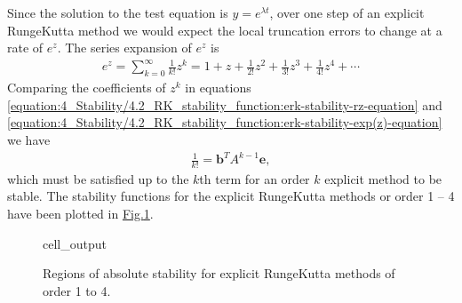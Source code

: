\documentclass[letterpaper,10pt,english]{jupyterBook}
\begin{document}
\sphinxAtStartPar
Since the solution to the test equation is \(y=e^{\lambda t}\), over one step of an explicit Runge\sphinxhyphen{}Kutta method we would expect the local truncation errors to change at a rate of \(e^z\). The series expansion of \(e^z\) is
\begin{equation}\label{equation:4_Stability/4.2_RK_stability_function:erk-stability-exp(z)-equation}
\begin{split}e^z = \sum_{k=0}^{\infty} \frac{1}{k!} z^k = 1 + z + \frac{1}{2!}z^2 + \frac{1}{3!}z^3 + \frac{1}{4!}z^4 + \cdots\end{split}
\end{equation}
\sphinxAtStartPar
Comparing the coefficients of \(z^k\) in equations \eqref{equation:4_Stability/4.2_RK_stability_function:erk-stability-rz-equation} and \eqref{equation:4_Stability/4.2_RK_stability_function:erk-stability-exp(z)-equation} we have
\begin{align*}
    \frac{1}{k!}= \mathbf{b}^T A^{k-1} \mathbf{e},
\end{align*}
\sphinxAtStartPar
which must be satisfied up to the \(k\)th term for an order \(k\) explicit method to be stable. The stability functions for the explicit Runge\sphinxhyphen{}Kutta methods or order 1 – 4 have been plotted in \hyperref[\detokenize{4_Stability/4.2_RK_stability_function:erk-stability-regions-figure}]{Fig.\@ \ref{\detokenize{4_Stability/4.2_RK_stability_function:erk-stability-regions-figure}}}.

\begin{figure}[htbp]
\centering
\capstart
\begin{sphinxVerbatimOutput}

\begin{sphinxuseclass}{cell_output}
\noindent{}

\end{sphinxuseclass}\end{sphinxVerbatimOutput}
\caption{Regions of absolute stability for explicit Runge\sphinxhyphen{}Kutta methods of order 1 to 4.}\label{\detokenize{4_Stability/4.2_RK_stability_function:erk-stability-regions-figure}}\end{figure}
\end{document}
